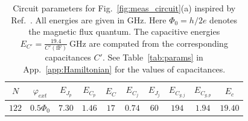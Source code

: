 \documentclass[%
reprint,
superscriptaddress,
 amsmath,amssymb,
 aps,
 prx,
longbibliography,
floatfix,
]{revtex4-2}
\begin{document}
\renewcommand{\arraystretch}{1.5} %
\begin{table}[htb]
\centering
\begin{tabular}{|c|c|c|c|c|c|c|c|c|c|}
    \hline
     $N$ & $\varphi_{ext}$ & $E_{J_p}$ & $E_{C_p}$ & $E_C$ & $E_{C_j}$ & $E_{J_j}$ & $E_{C_{g,j}}$ & $E_{C_{g,p}}$ & $E_c$ \\
    \hline
    $122$ & $0.5\Phi_0$ & $7.30$ & $1.46$ & $17$ & $0.74$ & $60$ & $194$ & $1.94$ & $19.40$ \\
    \hline
\end{tabular}
\caption{Circuit parameters for Fig.~\ref{fig:meas_circuit}(a) inspired by Ref.~\cite{zhang_universal_2021}. All energies are given in GHz. Here $\Phi_0=h/2e$ denotes the magnetic flux quantum. The capacitive energies $E_{C'}=\frac{19.4}{{C'}(\mathrm{fF})} \ \mathrm{GHz}$ are computed from the corresponding capacitances $C'$. See Table~\ref{tab:params} in App.~\ref{app:Hamiltonian} for the values of capacitances.}
\label{tab:circuit_params}
\end{table}







\renewcommand{\arraystretch}{1.5} %
\end{document}
